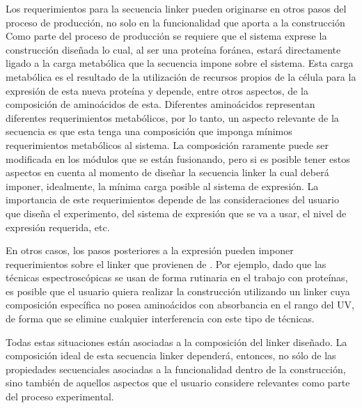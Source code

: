 Los requerimientos para la secuencia linker pueden originarse en otros pasos del proceso de producción, no solo en la funcionalidad que aporta a la construcción 
Como parte del proceso de producción se requiere que el sistema exprese la construcción diseñada lo cual, al ser una proteína foránea, estará directamente ligado a la carga
metabólica que la secuencia impone sobre el sistema\cite{glick1995metabolic}. Esta carga metabólica es el resultado de la utilización de recursos propios de la célula para la expresión de esta nueva proteína y depende, entre otros aspectos, 
de la composición de aminoácidos de esta. 
Diferentes aminoácidos representan diferentes requerimientos metabólicos, por lo tanto, un aspecto relevante de la secuencia es que esta tenga una composición que imponga mínimos requerimientos metabólicos al sistema. 
La composición raramente puede ser modificada en los módulos que se están fusionando, pero si es posible tener estos aspectos en cuenta al momento de diseñar la secuencia linker la cual deberá imponer, idealmente, 
la mínima carga posible al sistema de expresión. La importancia de este requerimientos depende de las consideraciones del usuario que diseña el experimento, del sistema de expresión que se va a usar, el nivel de expresión requerida, etc.

En otros casos, los pasos posteriores a la expresión pueden imponer requerimientos sobre el linker que provienen de .
Por ejemplo, dado que las técnicas espectroscópicas se usan de forma rutinaria en el trabajo con proteínas, es posible que el usuario 
quiera realizar la construcción utilizando un linker cuya composición específica no posea aminoácidos con absorbancia en el rango del UV, 
de forma que se elimine cualquier interferencia con este tipo de técnicas.

Todas estas situaciones están asociadas a la composición del linker diseñado. 
La composición ideal de esta secuencia linker dependerá, entonces, no sólo de las propiedades secuenciales asociadas a la funcionalidad dentro de la construcción, sino también de aquellos aspectos 
que el usuario considere relevantes como parte del proceso experimental.






